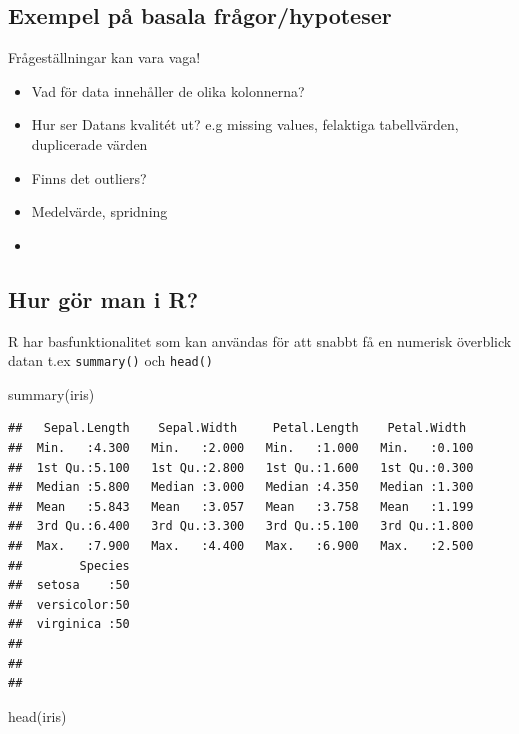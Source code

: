 \documentclass[
]{book}
\newenvironment{Shaded}{\begin{snugshade}}{\end{snugshade}}
\newcommand{\FunctionTok}[1]{\textcolor[rgb]{0.00,0.00,0.00}{#1}}
\newcommand{\NormalTok}[1]{#1}
\begin{document}
\hypertarget{exempel-puxe5-basala-fruxe5gorhypoteser}{%
\subsection{Exempel på basala frågor/hypoteser}\label{exempel-puxe5-basala-fruxe5gorhypoteser}}

Frågeställningar kan vara vaga!

\begin{itemize}
\item
  Vad för data innehåller de olika kolonnerna?
\item
  Hur ser Datans kvalitét ut? e.g missing values, felaktiga tabellvärden, duplicerade värden
\item
  Finns det outliers?
\item
  Medelvärde, spridning
\item
\end{itemize}

\hypertarget{hur-guxf6r-man-i-r}{%
\subsection{Hur gör man i R?}\label{hur-guxf6r-man-i-r}}

R har basfunktionalitet som kan användas för att snabbt få en numerisk överblick datan t.ex
\texttt{summary()} och \texttt{head()}

\begin{Shaded}
\begin{Highlighting}[]
\FunctionTok{summary}\NormalTok{(iris)}
\end{Highlighting}
\end{Shaded}

\begin{verbatim}
##   Sepal.Length    Sepal.Width     Petal.Length    Petal.Width   
##  Min.   :4.300   Min.   :2.000   Min.   :1.000   Min.   :0.100  
##  1st Qu.:5.100   1st Qu.:2.800   1st Qu.:1.600   1st Qu.:0.300  
##  Median :5.800   Median :3.000   Median :4.350   Median :1.300  
##  Mean   :5.843   Mean   :3.057   Mean   :3.758   Mean   :1.199  
##  3rd Qu.:6.400   3rd Qu.:3.300   3rd Qu.:5.100   3rd Qu.:1.800  
##  Max.   :7.900   Max.   :4.400   Max.   :6.900   Max.   :2.500  
##        Species  
##  setosa    :50  
##  versicolor:50  
##  virginica :50  
##                 
##                 
## 
\end{verbatim}

\begin{Shaded}
\begin{Highlighting}[]
\FunctionTok{head}\NormalTok{(iris)}
\end{Highlighting}
\end{Shaded}
\end{document}
